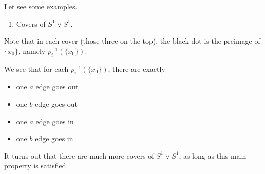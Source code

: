 \begin{eg}
	Let see some examples.
	\begin{enumerate}
		\item Covers of \(S^1\vee S^1\).
		      \begin{figure}[H]
			      \centering
			      \label{fig:eg:lec14:1}
		      \end{figure}
	\end{enumerate}
	Note that in each cover (those three on the top), the black dot is the preimage of \(\{x_0\}\), namely \(p_{i}^{-1} (\{x_0\})\).
	\begin{remark}
		We see that for each \(p_{i}^{-1} (\{x_0\})\), there are exactly
		\begin{itemize}
			\item one \(a\) edge goes out
			\item one \(b\) edge goes out
			\item one \(a\) edge goes in
			\item one \(b\) edge goes in
		\end{itemize}

		It turns out that there are much more covers of \(S^1\vee S^1\), as long as this main property is satisfied.
	\end{remark}
\end{eg}

